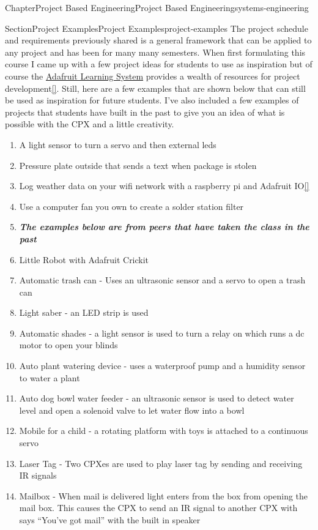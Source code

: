 \documentclass[oneside,10pt,]{book}
\newcommand{\xreffont}{\relax}
\newcommand{\linkhilite}[1]{\underline{#1}}
\newcommand{\alert}[1]{\textbf{\textit{#1}}}
\numberwithin{equation}{section}
\begin{document}
\begin{chapterptx}{Chapter}{Project Based Engineering}{}{Project Based Engineering}{}{}{systems-engineering}
\begin{sectionptx}{Section}{Project Examples}{}{Project Examples}{}{}{project-examples}
The project schedule and requirements previously shared is a general framework that can be applied to any project and has been for many many semesters. When first formulating this course I came up with a few project ideas for students to use as inspiration but of course the \href{https://learn.adafruit.com/}{\linkhilite{Adafruit Learning System}} provides a wealth of resources for project development\hyperlink{Adafruit}{\linkhilite{[{\xreffont 32}]}}. Still, here are a few examples that are shown below that can still be used as inspiration for future students. I've also included a few examples of projects that students have built in the past to give you an idea of what is possible with the CPX and a little creativity.%
\begin{enumerate}
\item{}A light sensor to turn a servo and then external leds%
\item{}Pressure plate outside that sends a text when package is stolen%
\item{}Log weather data on your wifi network with a raspberry pi and Adafruit IO\hyperlink{Adafruit}{\linkhilite{[{\xreffont 32}]}}%
\item{}Use a computer fan you own to create a solder station filter%
\item{}\alert{The examples below are from peers that have taken the class in the past}%
\item{}Little Robot with Adafruit Crickit%
\item{}Automatic trash can - Uses an ultrasonic sensor and a servo to open a trash can%
\item{}Light saber - an LED strip is used%
\item{}Automatic shades - a light sensor is used to turn a relay on which runs a dc motor to open your blinds%
\item{}Auto plant watering device - uses a waterproof pump and a humidity sensor to water a plant%
\item{}Auto dog bowl water feeder - an ultrasonic sensor is used to detect water level and open a solenoid valve to let water flow into a bowl%
\item{}Mobile for a child - a rotating platform with toys is attached to a continuous servo%
\item{}Laser Tag - Two CPXes are used to play laser tag by sending and receiving IR signals%
\item{}Mailbox - When mail is delivered light enters from the box from opening the mail box. This causes the CPX to send an IR signal to another CPX with says “You’ve got mail” with the built in speaker%

\end{enumerate}
\end{sectionptx}
\end{chapterptx}
\end{document}

